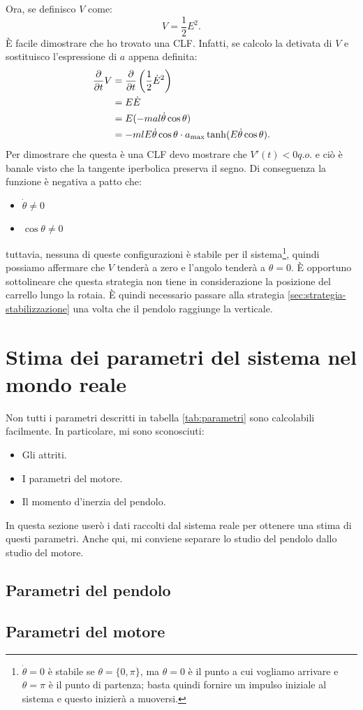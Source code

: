 Ora, se definisco $V$ come:
\begin{equation}
    V = \frac 1 2 E^2.
    \label{eq:lyapunov-energy}
\end{equation}
È facile dimostrare che ho trovato una CLF. Infatti, se calcolo la detivata di $V$ e sostituisco l'espressione di $a$ appena definita:
\begin{equation}
\begin{aligned}
    \frac \partial {\partial t} V &= \frac \partial {\partial t} \left( \frac 1 2 \dot E^2\right) \\
                  &=  E \dot E \\
                  &=  E (-mal \dot \theta \cos \theta) \\
                  &= -mlE\dot \theta \cos \theta \cdot a_{\max} \tanh(E \dot \theta \cos \theta).
    \end{aligned}
    \label{eq:lyapunov-energy}
\end{equation}
Per dimostrare che questa è una CLF devo mostrare che $V'(t) < 0 q.o.$ e ciò è banale visto che la tangente iperbolica preserva il segno. Di conseguenza la funzione è negativa a patto che:
\begin{itemize}
    \item $\dot \theta \neq 0$
    \item $\cos \theta \neq 0$
\end{itemize}
tuttavia, nessuna di queste configurazioni è stabile per il sistema\footnote{$\dot \theta = 0$ è stabile se $\theta = \{0, \pi\}$, ma $\theta = 0$ è il punto a cui vogliamo arrivare e $\theta = \pi$ è il punto di partenza; basta quindi fornire un impulso iniziale al sistema e questo inizierà a muoversi.}, quindi possiamo affermare che $V$ tenderà a zero e l'angolo tenderà a $\theta = 0$.
È opportuno sottolineare che questa strategia non tiene in considerazione la posizione del carrello lungo la rotaia. È quindi necessario passare alla strategia \ref{sec:strategia-stabilizzazione}
una volta che il pendolo raggiunge la verticale.



\section{Stima dei parametri del sistema nel mondo reale}
Non tutti i parametri descritti in tabella \ref{tab:parametri} sono calcolabili facilmente. In particolare, mi sono sconosciuti:
\begin{itemize}
    \item Gli attriti.
    \item I parametri del motore.
    \item Il momento d'inerzia del pendolo.
\end{itemize}
In questa sezione userò i dati raccolti dal sistema reale per ottenere una stima di questi parametri. Anche qui, mi conviene separare lo studio del pendolo dallo studio del motore.

\subsection{Parametri del pendolo}



\subsection{Parametri del motore}
\label{subsec:parametri-motore}
